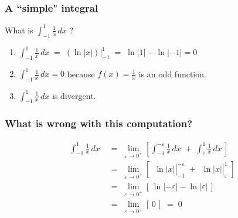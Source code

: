 \begin{frame}[t]
	\frametitle{A ``simple" integral}

	What is $\displaystyle \int_{-1}^{1}\frac{1}{x}\, dx$ \; ?

	\begin{enumerate}
		\vfill

		\item $\displaystyle \int_{-1}^{1}\frac{1}{x}\, dx \; = \; \left( \ln |x| \right
			) \Big\vert_{-1}^{1}\; = \; \ln|1| - \ln|-1| = 0$
			\vfill

		\item $\displaystyle \int_{-1}^{1}\frac{1}{x}\, dx = 0$ \; because $\displaystyle
			f(x) = \frac{1}{x}$ is an odd function.
			\vfill

		\item $\displaystyle \int_{-1}^{1}\frac{1}{x}\, dx$ is divergent.
			\vfill
	\end{enumerate}
\end{frame}

\begin{frame}[t]
	\frametitle{What is wrong with this computation?}

	\[
		\begin{aligned}
			\int_{-1}^{1}\frac{1}{x}\, dx \; & = \; \lim_{\varepsilon \to 0^+}\left[ \int_{-1}^{-\varepsilon}\frac{1}{x}\, dx \; + \; \int_{\varepsilon}^{1}\frac{1}{x}\, dx \, \right]                                                \\
			\;                               & = \; \lim_{\varepsilon \to 0^+}\left[ \left. \phantom{\frac{1}{1}}\ln|x| \right\vert_{-1}^{-\varepsilon}\; + \left. \phantom{\frac{1}{1}}\ln|x| \right\vert_{\varepsilon}^{1}\; \right] \\
			\;                               & = \; \lim_{\varepsilon \to 0^+}\left[ \, \ln|-\varepsilon| - \ln |\varepsilon| \, \right] \phantom{\int}                                                                                \\
			\;                               & = \; \lim_{\varepsilon \to 0^+}\left[ \, 0 \, \right] \; = \; 0 \phantom{\int}
		\end{aligned}
	\]
\end{frame}

